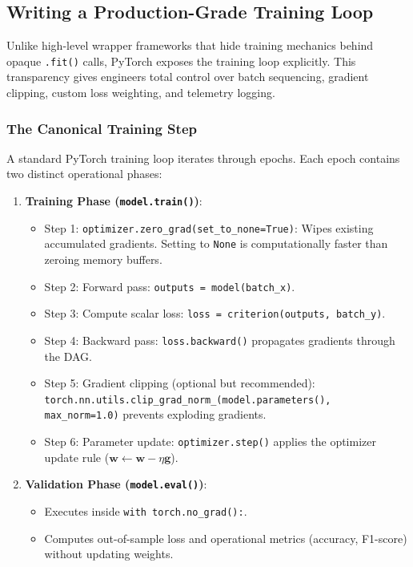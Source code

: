 \subsection{Writing a Production-Grade Training Loop}\label{subsec:training_loop}

Unlike high-level wrapper frameworks that hide training mechanics behind opaque \texttt{.fit()} calls, PyTorch exposes the training loop explicitly. This transparency gives engineers total control over batch sequencing, gradient clipping, custom loss weighting, and telemetry logging.

\subsubsection{The Canonical Training Step}

A standard PyTorch training loop iterates through epochs. Each epoch contains two distinct operational phases:
\begin{enumerate}
    \item \textbf{Training Phase (\texttt{model.train()})}:
    \begin{itemize}
        \item Step 1: \texttt{optimizer.zero\_grad(set\_to\_none=True)}: Wipes existing accumulated gradients. Setting to \texttt{None} is computationally faster than zeroing memory buffers.
        \item Step 2: Forward pass: \texttt{outputs = model(batch\_x)}.
        \item Step 3: Compute scalar loss: \texttt{loss = criterion(outputs, batch\_y)}.
        \item Step 4: Backward pass: \texttt{loss.backward()} propagates gradients through the DAG.
        \item Step 5: Gradient clipping (optional but recommended): \texttt{torch.nn.utils.clip\_grad\_norm\_(model.parameters(), max\_norm=1.0)} prevents exploding gradients.
        \item Step 6: Parameter update: \texttt{optimizer.step()} applies the optimizer update rule ($\mathbf{w} \leftarrow \mathbf{w} - \eta \mathbf{g}$).
    \end{itemize}
    \item \textbf{Validation Phase (\texttt{model.eval()})}:
    \begin{itemize}
        \item Executes inside \texttt{with torch.no\_grad():}.
        \item Computes out-of-sample loss and operational metrics (accuracy, F1-score) without updating weights.
    \end{itemize}
\end{enumerate}

